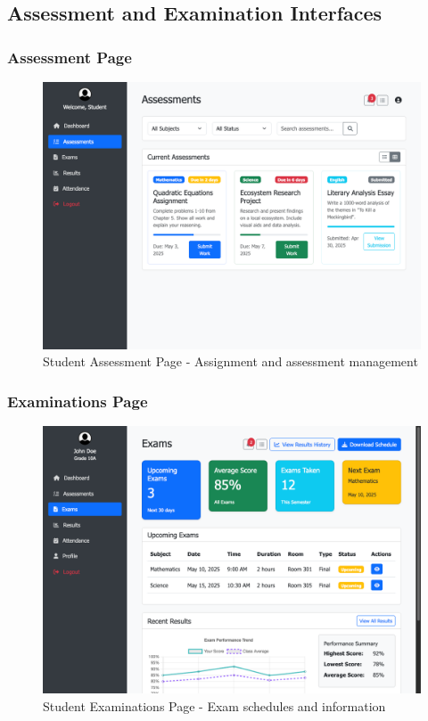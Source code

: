 \documentclass[12pt,a4paper]{article}
\begin{document}
\subsection{Assessment and Examination Interfaces}

\subsubsection{Assessment Page}
\begin{figure}[H]
    \centering
    \includegraphics[width=\textwidth]{student/student-assessment-page.png}
    \caption{Student Assessment Page - Assignment and assessment management}
    \label{fig:student-assessment}
\end{figure}

\subsubsection{Examinations Page}
\begin{figure}[H]
    \centering
    \includegraphics[width=\textwidth]{student/student-exams-page.png}
    \caption{Student Examinations Page - Exam schedules and information}
    \label{fig:student-exams}
\end{figure}
\end{document}
